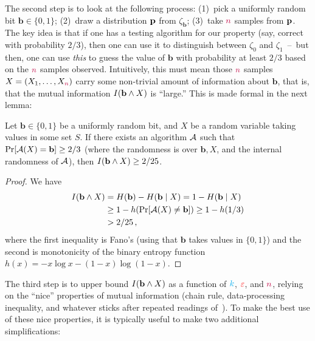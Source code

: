 The second step is to look at the following process: (1)~pick a uniformly random bit $\mathbf{b}\in\{0,1\}$; (2)~draw a distribution $\mathbf{p}$ from $\zeta_{\mathbf{b}}$; (3)~take ${\textcolor{purple}{n}}$ \iid samples from $\mathbf{p}$. The key idea is that if one has a testing algorithm for our property (say, correct with probability $2/3$), then one can use it to distinguish between $\zeta_0$ and $\zeta_1$~--~but then, one can use \emph{this} to guess the value of $\mathbf{b}$ with probability at least $2/3$ based on the ${\textcolor{purple}{n}}$ samples observed. Intuitively, this must mean those ${\textcolor{purple}{n}}$ samples $X=(X_1,\dots,X_{\textcolor{purple}{n}})$ carry some non-trivial amount of information about $\mathbf{b}$, that is, that the mutual information $\mutualinfo{\mathbf{b}}{X}$ is ``large.'' This is made formal in the next lemma:
\begin{fact}
	\label{fact:fano}
 Let $\mathbf{b}\in\{0,1\}$ be a uniformly random bit, and $X$ be a random variable taking values in some set $S$. If there exists an algorithm $\mathcal{A}$ such that
 $
 	\bPr{\Algo(X)=\mathbf{b}} \geq 2/3
 $ (where the randomness is over $\mathbf{b}, X$, and the internal randomness of $\mathcal{A}$), then $\mutualinfo{\mathbf{b}}{X} \geq 2/25$.
\end{fact}
\begin{proof}
We have 
\begin{align*}
	\mutualinfo{\mathbf{b}}{X} &= \entropy{\mathbf{b}} - \entropy{\mathbf{b}\mid X} = 1 - \entropy{\mathbf{b}\mid X} \\
	&\geq 1-h(\bPr{\Algo(X)\neq \mathbf{b}}) \geq 1-h(1/3) \\
	&> 2/25\,,
\end{align*}
where the first inequality is Fano's (using that $\mathbf{b}$ takes values in $\{0,1\}$) and the second is monotonicity of the binary entropy function $h(x) = -x\log x - (1-x)\log(1-x)$.
\end{proof}
The third step is to upper bound $\mutualinfo{\mathbf{b}}{X}$ as a function of ${\textcolor{cyan}{k}}$, $\textcolor{red}{\varepsilon}$, and ${\textcolor{purple}{n}}$, relying on the ``nice'' properties of mutual information (\eg chain rule, data-processing inequality, and whatever sticks after repeated readings of~\citet[Chapter~2]{CoverThomas:06}). To make the best use of these nice properties, it is typically useful to make two additional simplifications:
